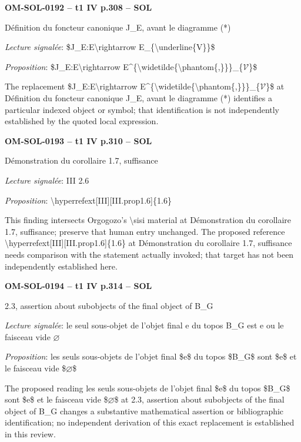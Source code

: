 \par\noindent\textbf{OM-SOL-0192 -- t1 IV p.308 -- SOL}\par
Définition du foncteur canonique J\_E, avant le diagramme (*)\par
\emph{Lecture signalée}: \$J\_E:E\textbackslash{}rightarrow E\_\{\textbackslash{}underline\{V\}\}\$\par
\emph{Proposition}: \$J\_E:E\textbackslash{}rightarrow E\textasciicircum{}\{\textbackslash{}widetilde\{\textbackslash{}phantom\{,\}\}\}\_\{\ensuremath{𝒱}\}\$\par
The replacement \$J\_E:E\textbackslash{}rightarrow E\textasciicircum{}\{\textbackslash{}widetilde\{\textbackslash{}phantom\{,\}\}\}\_\{\ensuremath{𝒱}\}\$ at Définition du foncteur canonique J\_E, avant le diagramme (*) identifies a particular indexed object or symbol; that identification is not independently established by the quoted local expression.\par
\par\noindent\textbf{OM-SOL-0193 -- t1 IV p.310 -- SOL}\par
Démonstration du corollaire 1.7, suffisance\par
\emph{Lecture signalée}: III 2.6\par
\emph{Proposition}: \textbackslash{}hyperrefext[III][III.prop1.6]\{1.6\}\par
This finding intersects Orgogozo's \textbackslash{}sisi material at Démonstration du corollaire 1.7, suffisance; preserve that human entry unchanged. The proposed reference \textbackslash{}hyperrefext[III][III.prop1.6]\{1.6\} at Démonstration du corollaire 1.7, suffisance needs comparison with the statement actually invoked; that target has not been independently established here.\par
\par\noindent\textbf{OM-SOL-0194 -- t1 IV p.314 -- SOL}\par
2.3, assertion about subobjects of the final object of B\_G\par
\emph{Lecture signalée}: le seul sous-objet de l'objet final e du topos B\_G est e ou le faisceau vide \ensuremath{\varnothing}\par
\emph{Proposition}: les seuls sous-objets de l'objet final \$e\$ du topos \$B\_G\$ sont \$e\$ et le faisceau vide \$\ensuremath{\varnothing}\$\par
The proposed reading les seuls sous-objets de l'objet final \$e\$ du topos \$B\_G\$ sont \$e\$ et le faisceau vide \$\ensuremath{\varnothing}\$ at 2.3, assertion about subobjects of the final object of B\_G changes a substantive mathematical assertion or bibliographic identification; no independent derivation of this exact replacement is established in this review.\par
